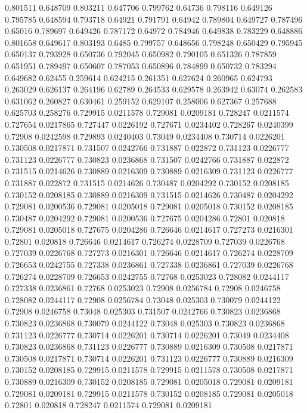 0.801511 0.648709
0.803211 0.647706
0.799762 0.64736
0.798116 0.649126
0.795785 0.648594
0.793718 0.64921
0.791791 0.64942
0.789804 0.649727
0.787496 0.65016
0.789697 0.649426
0.787172 0.64972
0.784946 0.649838
0.783229 0.648886
0.801658 0.649617
0.803193 0.6485
0.799757 0.648656
0.798248 0.650429
0.795945 0.650137
0.793928 0.650736
0.792045 0.650982
0.790105 0.651326
0.787859 0.651951
0.789497 0.650607
0.787053 0.650896
0.784899 0.650732
0.783294 0.649682
0.62455 0.259614
0.624215 0.261351
0.627624 0.260965
0.624793 0.263029
0.626137 0.264196
0.62789 0.264533
0.629578 0.263942
0.63074 0.262583
0.631062 0.260827
0.630461 0.259152
0.629107 0.258006
0.627367 0.257688
0.625703 0.258276
0.729915 0.0211578
0.729081 0.0209181
0.728247 0.0211574
0.727654 0.0217865
0.727447 0.0226192
0.727671 0.0234402
0.728267 0.0240399
0.72908 0.0242598
0.729893 0.0240403
0.73049 0.0234408
0.730714 0.0226201
0.730508 0.0217871
0.731507 0.0242766
0.731887 0.022872
0.731123 0.0226777
0.731123 0.0226777
0.730823 0.0236868
0.731507 0.0242766
0.731887 0.022872
0.731515 0.0214626
0.730889 0.0216309
0.730889 0.0216309
0.731123 0.0226777
0.731887 0.022872
0.731515 0.0214626
0.730487 0.0204292
0.730152 0.0208185
0.730152 0.0208185
0.730889 0.0216309
0.731515 0.0214626
0.730487 0.0204292
0.729081 0.0200536
0.729081 0.0205018
0.729081 0.0205018
0.730152 0.0208185
0.730487 0.0204292
0.729081 0.0200536
0.727675 0.0204286
0.72801 0.020818
0.729081 0.0205018
0.727675 0.0204286
0.726646 0.0214617
0.727273 0.0216301
0.72801 0.020818
0.726646 0.0214617
0.726274 0.0228709
0.727039 0.0226768
0.727039 0.0226768
0.727273 0.0216301
0.726646 0.0214617
0.726274 0.0228709
0.726653 0.0242755
0.727338 0.0236861
0.727338 0.0236861
0.727039 0.0226768
0.726274 0.0228709
0.726653 0.0242755
0.72768 0.0253023
0.728082 0.0244117
0.727338 0.0236861
0.72768 0.0253023
0.72908 0.0256784
0.72908 0.0246758
0.728082 0.0244117
0.72908 0.0256784
0.73048 0.025303
0.730079 0.0244122
0.72908 0.0246758
0.73048 0.025303
0.731507 0.0242766
0.730823 0.0236868
0.730823 0.0236868
0.730079 0.0244122
0.73048 0.025303
0.730823 0.0236868
0.731123 0.0226777
0.730714 0.0226201
0.730714 0.0226201
0.73049 0.0234408
0.730823 0.0236868
0.731123 0.0226777
0.730889 0.0216309
0.730508 0.0217871
0.730508 0.0217871
0.730714 0.0226201
0.731123 0.0226777
0.730889 0.0216309
0.730152 0.0208185
0.729915 0.0211578
0.729915 0.0211578
0.730508 0.0217871
0.730889 0.0216309
0.730152 0.0208185
0.729081 0.0205018
0.729081 0.0209181
0.729081 0.0209181
0.729915 0.0211578
0.730152 0.0208185
0.729081 0.0205018
0.72801 0.020818
0.728247 0.0211574
0.729081 0.0209181
